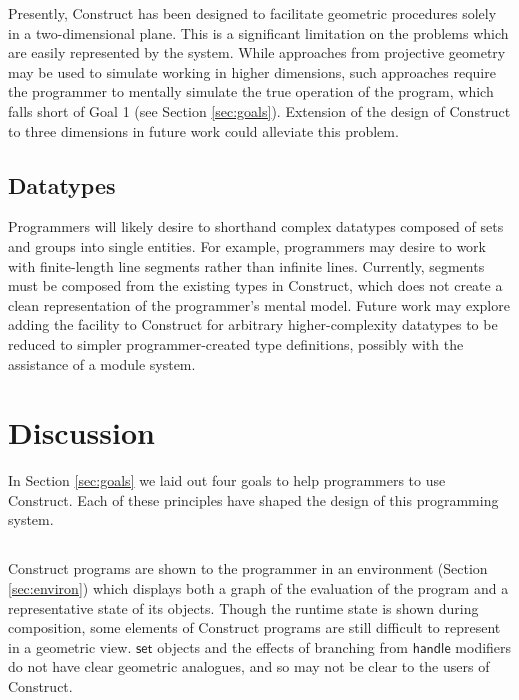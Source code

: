 \documentclass[twoside,openright,11pt]{report}
\begin{document}
Presently, Construct has been designed to facilitate geometric procedures solely in a two-dimensional plane. 
This is a significant limitation on the problems which are easily represented by the system. 
While approaches from projective geometry may be used to simulate working in higher dimensions, such approaches require the programmer to mentally simulate the true operation of the program, which falls short of Goal 1 (see Section \ref{sec:goals}).
Extension of the design of Construct to three dimensions in future work could alleviate this problem.

\subsection{Datatypes}

Programmers will likely desire to shorthand complex datatypes composed of sets and groups into single entities. 
For example, programmers may desire to work with finite-length line segments rather than infinite lines.
Currently, segments must be composed from the existing types in Construct, which does not create a clean representation of the programmer's mental model.
Future work may explore adding the facility to Construct for arbitrary higher-complexity datatypes to be reduced to simpler programmer-created type definitions, possibly with the assistance of a module system.

\section{Discussion}
\label{sec:discuss}

In Section \ref{sec:goals} we laid out four goals to help programmers to use Construct. Each of these principles have shaped the design of this programming system.

\subsection{\constructgoalsclear}

Construct programs are shown to the programmer in an environment (Section \ref{sec:environ}) which displays both a graph of the evaluation of the program and a representative state of its objects.
Though the runtime state is shown during composition, some elements of Construct programs are still difficult to represent in a geometric view. 
$\mathsf{set}$ objects and the effects of branching from $\mathsf{handle}$ modifiers do not have clear geometric analogues, and so may not be clear to the users of Construct.
\end{document}
